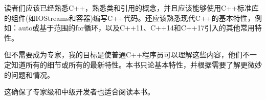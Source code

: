读者们应该已经熟悉C++，熟悉类和引用的概念，并且应该能够使用C++标准库的组件(如IOStreams和容器)编写C++代码。还应该熟悉现代C++的基本特性，例如：auto或基于范围的for循环，以及C++11、C++14和C++17引入的其他常用特性。

但不需要成为专家，我的目标是使普通C++程序员可以理解这些内容，他们不一定知道所有的细节或所有的最新特性。本书只论基本特性，并根据需要了解更微妙的问题和情况。

这确保了专家级和中级开发者也适合阅读本书。